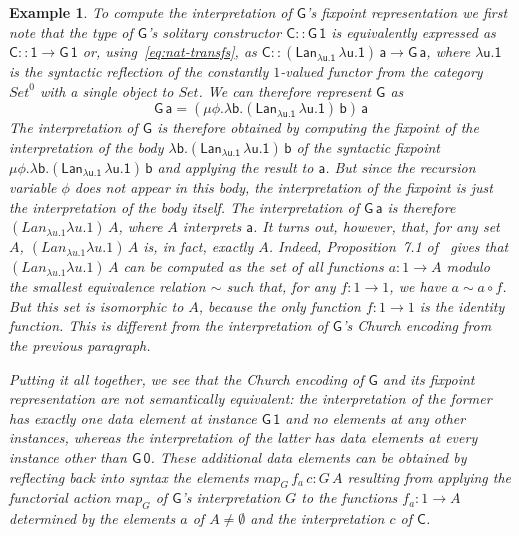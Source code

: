 \documentclass[submission,copyright,creativecommons]{eptcs}
\newtheorem{example}[thm]{Example}
\newcommand{\set}{\mathsf{Set}}
\begin{document}
\begin{example}
To compute the interpretation of $\mathsf{G}$'s fixpoint
representation we first note that the type of $\mathsf{G}$'s solitary
constructor $\mathsf{C :: G\,1}$ is equivalently expressed as
$\mathsf{C :: 1 \to G\,1}$ or, using~\eqref{eq:nat-transfs}, as
$\mathsf{C :: (Lan_{\lambda u. 1}\,\lambda u. 1)\,a \to G\, a}$, where
$\mathsf{\lambda u. 1}$ is the syntactic reflection of the constantly
$1$-valued functor from the category $\mathit{Set}^0$ with a single
object to $\mathit{Set}$. We can therefore represent $\mathsf{G}$ as
\[\mathsf{G\,a} = \mathsf{(\mu \phi. \lambda b.
 (Lan_{\lambda u. 1} \,\lambda u.  1)\,b)\,a}\] The interpretation of
$\mathsf{G}$ is therefore obtained by computing the fixpoint of the
interpretation of the body $\mathsf{\lambda b. (Lan_{\lambda u. 1}
  \,\lambda u. 1)\,b}$ of the syntactic fixpoint $\mathsf{\mu
  \phi. \lambda b.  (Lan_{\lambda u. 1} \,\lambda u.  1)\,b}$ and
applying the result to $\mathsf{a}$. But since the recursion variable
$\mathsf{\phi}$ does not appear in this body, the interpretation of
the fixpoint is just the interpretation of the body itself.  The
interpretation of $\mathsf{G\,a}$ is therefore $(\mathit{Lan}_{\lambda
  u. 1} \lambda u. 1)\, A$, where $A$ interprets $\mathsf{a}$.
It turns out, however, that, for any set $A$, $(\mathit{Lan}_{\lambda
  u. 1} \lambda u. 1)\,A$ is, in fact, exactly $A$. Indeed,
Proposition~7.1 of~\cite{blw03} gives that $(\mathit{Lan}_{\lambda
  u. 1} \lambda u. 1)\,A$ can be computed as the set of all functions
$a : 1 \to A$ modulo the smallest equivalence relation $\sim$ such
that, for any $f : 1 \to 1$, we have $a \sim a \circ f$.  But this set
is isomorphic to $A$, because the only function $f : 1 \to 1$ is the
identity function. This is different from the interpretation of
$\mathsf{G}$'s Church encoding from the previous paragraph.

Putting it all together, we see that the Church encoding of
$\mathsf{G}$ and its fixpoint representation are not semantically
equivalent: the interpretation of the former has exactly one data
element at instance $\mathsf{G\,1}$ and no elements at any other
instances, whereas the interpretation of the latter has data elements
at every instance other than $\mathsf{G\,0}$.
These additional data elements can be obtained by reflecting back into
syntax the elements $\mathit{map}_G\,f_a\,c : G\,A$ resulting from
applying the functorial action $\mathit{map}_G$ of $\mathsf{G}$'s
interpretation $G$ to the functions $f_a : 1 \to A$ determined by the
elements $a$ of $A \not = \emptyset$ and the interpretation $c$ of
$\mathsf{C}$.
\end{example}
\end{document}
